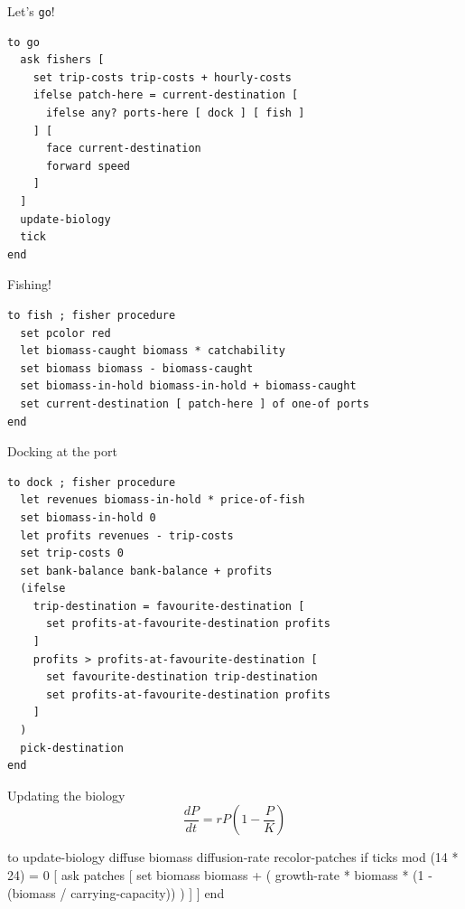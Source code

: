 \documentclass[table, 14pt, aspectratio=169]{beamer}
\begin{document}
\begin{frame}[fragile=singleslide]{Let's \texttt{go}!}
  \begin{adjustbox}{max height=0.8\textheight, max width = \linewidth}
    \begin{verbatim}
to go
  ask fishers [
    set trip-costs trip-costs + hourly-costs
    ifelse patch-here = current-destination [
      ifelse any? ports-here [ dock ] [ fish ]
    ] [
      face current-destination
      forward speed
    ]
  ]
  update-biology
  tick
end
    \end{verbatim}
  \end{adjustbox}
\end{frame}

\begin{frame}[fragile=singleslide]{Fishing!}
  \begin{adjustbox}{max height=0.8\textheight, max width = \linewidth}
    \begin{verbatim}
to fish ; fisher procedure
  set pcolor red
  let biomass-caught biomass * catchability
  set biomass biomass - biomass-caught
  set biomass-in-hold biomass-in-hold + biomass-caught
  set current-destination [ patch-here ] of one-of ports
end
    \end{verbatim}
  \end{adjustbox}
\end{frame}

\begin{frame}[fragile=singleslide]{Docking at the port}
  \begin{adjustbox}{max height=0.8\textheight, max width = \linewidth}
    \begin{verbatim}
to dock ; fisher procedure
  let revenues biomass-in-hold * price-of-fish
  set biomass-in-hold 0
  let profits revenues - trip-costs
  set trip-costs 0
  set bank-balance bank-balance + profits
  (ifelse
    trip-destination = favourite-destination [
      set profits-at-favourite-destination profits
    ]
    profits > profits-at-favourite-destination [
      set favourite-destination trip-destination
      set profits-at-favourite-destination profits
    ]
  )
  pick-destination
end
    \end{verbatim}
  \end{adjustbox}
\end{frame}


\begin{frame}[fragile=singleslide]{Updating the biology}
  \vfill
  $$\frac{dP}{dt}=r P \left(1 - \frac{P}{K}\right)$$
  \vfill
  \begin{adjustbox}{max width=\linewidth}
    \begin{nlogo}
to update-biology
  diffuse biomass diffusion-rate
  recolor-patches
  if ticks mod (14 * 24) = 0 [
    ask patches [
      set biomass biomass + (
        growth-rate * biomass * (1 - (biomass / carrying-capacity))
      )
    ]
  ]
end
    \end{nlogo}
  \end{adjustbox}
\end{frame}
\end{document}
